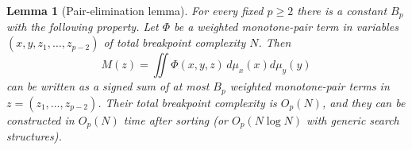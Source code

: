\documentclass[12pt,a4paper]{article}
\newtheorem{lemma}[theorem]{Lemma}
\theoremstyle{definition}
\newcommand{\1}{\mathbf 1}
\begin{document}
\begin{lemma}[Pair-elimination lemma]                             \label{lem:pairelim}
For every fixed $p\ge2$ there is a constant $B_p$ with the following property.  Let $\Phi$ be a weighted monotone-pair term in variables $(x,y,z_1,\ldots,z_{p-2})$ of total breakpoint complexity $N$.  Then
\begin{equation}
M(z)=\iint \Phi(x,y,z)\,d\mu_x(x)d\mu_y(y)                       \label{eq:pairelim}
\end{equation}
can be written as a signed sum of at most $B_p$ weighted monotone-pair terms in $z=(z_1,\ldots,z_{p-2})$.  Their total breakpoint complexity is $O_p(N)$, and they can be constructed in $O_p(N)$ time after sorting (or $O_p(N\log N)$ with generic search structures).
\end{lemma}
\end{document}
